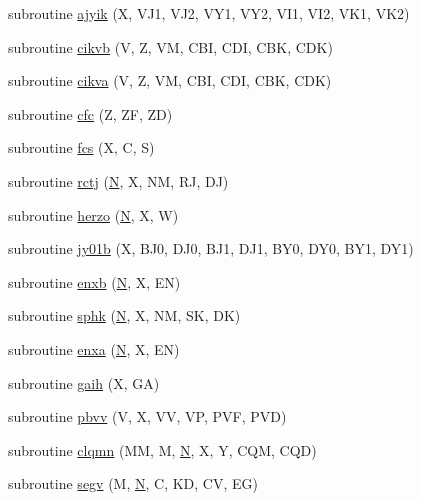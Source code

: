 \begin{DoxyCompactItemize}
subroutine \hyperlink{specfun_8f_adcd6df761527456b01e864a3ccf26c86}{ajyik} (X, V\+J1, V\+J2, V\+Y1, V\+Y2, V\+I1, V\+I2, V\+K1, V\+K2)
\item 
subroutine \hyperlink{specfun_8f_a5cdc37bce916b21807ab33e0823183b2}{cikvb} (V, Z, V\+M, C\+B\+I, C\+D\+I, C\+B\+K, C\+D\+K)
\item 
subroutine \hyperlink{specfun_8f_a06f4ebb13f467e54f01d355fa284704c}{cikva} (V, Z, V\+M, C\+B\+I, C\+D\+I, C\+B\+K, C\+D\+K)
\item 
subroutine \hyperlink{specfun_8f_a8c085466516172452097fe9f35a1c2d6}{cfc} (Z, Z\+F, Z\+D)
\item 
subroutine \hyperlink{specfun_8f_a7e21ba5739786f1e15dfa54c2e1b0f9a}{fcs} (X, C, S)
\item 
subroutine \hyperlink{specfun_8f_a7c889d5bb3cb3793b4895353d8e2e672}{rctj} (\hyperlink{polmisc_8c_a0240ac851181b84ac374872dc5434ee4}{N}, X, N\+M, R\+J, D\+J)
\item 
subroutine \hyperlink{specfun_8f_a85c0922a97453bb50a97e075026c295b}{herzo} (\hyperlink{polmisc_8c_a0240ac851181b84ac374872dc5434ee4}{N}, X, W)
\item 
subroutine \hyperlink{specfun_8f_a1e62ae4a0eb95063371be044c31d24e1}{jy01b} (X, B\+J0, D\+J0, B\+J1, D\+J1, B\+Y0, D\+Y0, B\+Y1, D\+Y1)
\item 
subroutine \hyperlink{specfun_8f_a0ec43194b7dee15522ea94bc241e6fc7}{enxb} (\hyperlink{polmisc_8c_a0240ac851181b84ac374872dc5434ee4}{N}, X, E\+N)
\item 
subroutine \hyperlink{specfun_8f_aa691eb14e44e17dd24db865c531f8c9b}{sphk} (\hyperlink{polmisc_8c_a0240ac851181b84ac374872dc5434ee4}{N}, X, N\+M, S\+K, D\+K)
\item 
subroutine \hyperlink{specfun_8f_a2528cc1ce1b5646515fa58acc599963e}{enxa} (\hyperlink{polmisc_8c_a0240ac851181b84ac374872dc5434ee4}{N}, X, E\+N)
\item 
subroutine \hyperlink{specfun_8f_af146bf16a4620fc1f8f84378dcd49602}{gaih} (X, G\+A)
\item 
subroutine \hyperlink{specfun_8f_a968b8818da9376243e724a6a47c62907}{pbvv} (V, X, V\+V, V\+P, P\+V\+F, P\+V\+D)
\item 
subroutine \hyperlink{specfun_8f_a1a535a5d64fe9905b62c0c8f320e6694}{clqmn} (M\+M, M, \hyperlink{polmisc_8c_a0240ac851181b84ac374872dc5434ee4}{N}, X, Y, C\+Q\+M, C\+Q\+D)
\item 
subroutine \hyperlink{specfun_8f_a8ddec986636326eae8f3a454bb08439d}{segv} (M, \hyperlink{polmisc_8c_a0240ac851181b84ac374872dc5434ee4}{N}, C, K\+D, C\+V, E\+G)

\end{DoxyCompactItemize}
